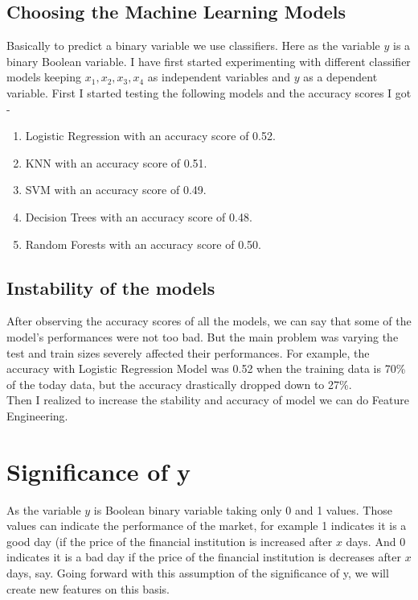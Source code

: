 \documentclass[conference]{IEEEtran}
\begin{document}
\subsection{Choosing the Machine Learning Models}
Basically to predict a binary variable we use classifiers. Here as the variable $y$ is a binary Boolean variable. I have first started experimenting with different classifier models keeping $x_{1}, x_{2}, x_{3}, x_{4}$ as independent variables and $y$ as a dependent variable. First I started testing the following models and the accuracy scores I got - 
\begin{enumerate}
\item Logistic Regression with an accuracy score of 0.52.
\item KNN with an accuracy score of 0.51.
\item SVM with an accuracy score of 0.49.
\item Decision Trees with an accuracy score of 0.48.
\item Random Forests with an accuracy score of 0.50.
\end{enumerate}
\subsection{Instability of the models}
After observing the accuracy scores of all the models, we can say that some of the model's performances were not too bad. But the main problem was varying the test and train sizes severely affected their performances. For example, the accuracy with Logistic Regression Model was 0.52 when the training data is 70\% of the today data, but the accuracy drastically dropped down to 27\%. \\

Then I realized to increase the stability and accuracy of model we can do Feature Engineering. 

\section{Significance of y}
As the variable $y$ is Boolean binary variable taking only 0 and 1 values. Those values can indicate the performance of the market, for example 1 indicates it is a good day (if the price of the financial institution is increased after $x$ days. And 0 indicates it is a bad day if the price of the financial institution is decreases after $x$ days, say. Going forward with this assumption of the significance of y, we will create new features on this basis.
\end{document}

